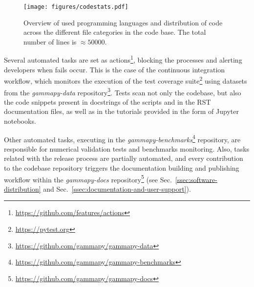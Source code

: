 \documentclass[traditabstract, longauth]{aa}
\begin{document}

\begin{figure}[t]
	\centering
	\texttt{[image: figures/codestats.pdf]}
	\caption{
		Overview of used programming languages and distribution of code across the different file
        categories in the \gammapy code base. The total number of lines is $\approx 50 000$.
    } \label{fig:codestats:lang}
\end{figure}

Several automated tasks are set as \github
actions\footnote{\url{https://github.com/features/actions}}, blocking the
processes and alerting developers when fails occur. This is the case of the
continuous integration workflow, which monitors the execution of the test coverage
suite\footnote{\url{https://pytest.org}} using datasets from the
\textit{gammapy-data} repository\footnote{\url{https://github.com/gammapy/gammapy-data}}.
Tests scan not only the codebase, but also the
code snippets present in docstrings of the scripts and in the RST documentation
files, as well as in the tutorials provided in the form of Jupyter notebooks.

Other automated tasks, executing in the
\textit{gammapy-benchmarks}\footnote{\url{https://github.com/gammapy/gammapy-benchmarks}} repository,
are responsible for numerical validation tests and benchmarks monitoring. Also,
tasks related with the release process are partially automated, and every
contribution to the codebase repository triggers the documentation building and
publishing workflow within the
\textit{gammapy-docs} repository\footnote{\url{https://github.com/gammapy/gammapy-docs}}
(see Sec.~\ref{ssec:software-distribution} and Sec.~\ref{ssec:documentation-and-user-support}).
\end{document}
